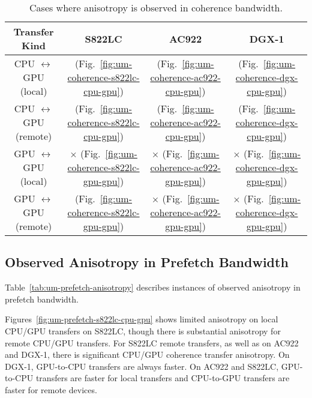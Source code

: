 \begin{table}[ht]
	\centering
	\caption[Anisotropy in coherence bandwidth]{
		Cases where anisotropy is observed in coherence bandwidth.
	}
	\label{tab:um-coherence-anisotropy}
	\begin{tabular}{cccc}
		\hline
		\textbf{Transfer Kind}             & \textbf{S822LC}                                         & \textbf{AC922}                                         & \textbf{DGX-1}                                      \\ \hline 
		CPU $\leftrightarrow$ GPU (local)  & \checkmark (Fig.~\ref{fig:um-coherence-s822lc-cpu-gpu}) & \checkmark (Fig.~\ref{fig:um-coherence-ac922-cpu-gpu}) & \checkmark (Fig.~\ref{fig:um-coherence-dgx-cpu-gpu}) \\ \hline
		CPU $\leftrightarrow$ GPU (remote) & \checkmark (Fig.~\ref{fig:um-coherence-s822lc-cpu-gpu}) & \checkmark (Fig.~\ref{fig:um-coherence-ac922-cpu-gpu}) & \checkmark (Fig.~\ref{fig:um-coherence-dgx-cpu-gpu}) \\ \hline
		GPU $\leftrightarrow$ GPU (local)  & $\times$   (Fig.~\ref{fig:um-coherence-s822lc-gpu-gpu}) & $\times$   (Fig.~\ref{fig:um-coherence-ac922-gpu-gpu}) & $\times$   (Fig.~\ref{fig:um-coherence-dgx-gpu-gpu}) \\ \hline
		GPU $\leftrightarrow$ GPU (remote) & \checkmark (Fig.~\ref{fig:um-coherence-s822lc-gpu-gpu}) & $\times$   (Fig.~\ref{fig:um-coherence-ac922-gpu-gpu}) & $\times$   (Fig.~\ref{fig:um-coherence-dgx-gpu-gpu}) \\ \hline
	\end{tabular}
\end{table}

\subsection{Observed Anisotropy in Prefetch Bandwidth}

Table~\ref{tab:um-prefetch-anisotropy} describes instances of observed anisotropy in prefetch bandwidth.

Figures~\ref{fig:um-prefetch-s822lc-cpu-gpu} shows limited anisotropy on local CPU/GPU transfers on S822LC, though there is substantial anisotropy for remote CPU/GPU transfers.
For S822LC remote transfers, as well as on AC922 and DGX-1, there is significant CPU/GPU coherence transfer anisotropy.
On DGX-1, GPU-to-CPU transfers are always faster.
On AC922 and S822LC, GPU-to-CPU transfers are faster for local transfers and CPU-to-GPU transfers are faster for remote devices.

